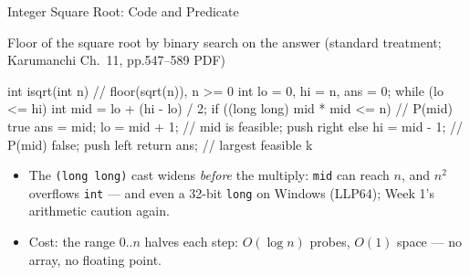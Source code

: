 \documentclass[aspectratio=169]{beamer}
\begin{document}
\begin{frame}[fragile]{Integer Square Root: Code and Predicate}
  \footnotesize
  \begin{block}{Floor of the square root by binary search on the answer
    (standard treatment; Karumanchi Ch.~11, pp.547--589 PDF)}
\begin{semiverbatim}
int isqrt(int n) {                       // floor(sqrt(n)), n >= 0
  int lo = 0, hi = n, ans = 0;
  while (lo <= hi) {
    int mid = lo + (hi - lo) / 2;
    if ((long long) mid * mid <= n) {     // P(mid) true
      ans = mid; lo = mid + 1;            // mid is feasible; push right
    } else hi = mid - 1;                  // P(mid) false; push left
  }
  return ans;                             // largest feasible k
}
\end{semiverbatim}
  \end{block}
  \begin{itemize}
    \item The \texttt{(long long)} cast widens \emph{before} the multiply:
      \texttt{mid} can reach $n$, and $n^2$ overflows \texttt{int} --- and even
      a 32-bit \texttt{long} on Windows (LLP64); Week 1's arithmetic caution
      again.
    \item Cost: the range $0..n$ halves each step: $O(\log n)$ probes,
      $O(1)$ space --- no array, no floating point.
  \end{itemize}
\end{frame}
\end{document}
